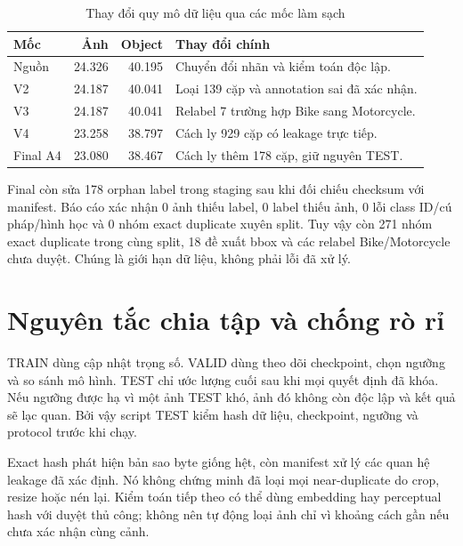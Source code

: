 \begin{table}[H]\centering
\caption{Thay đổi quy mô dữ liệu qua các mốc làm sạch}\label{tab:cleaning}
\begin{tabular}{lrrp{6.1cm}}\toprule
Mốc & Ảnh & Object & Thay đổi chính\\\midrule
Nguồn & 24.326 & 40.195 & Chuyển đổi nhãn và kiểm toán độc lập.\\
V2 & 24.187 & 40.041 & Loại 139 cặp và annotation sai đã xác nhận.\\
V3 & 24.187 & 40.041 & Relabel 7 trường hợp Bike sang Motorcycle.\\
V4 & 23.258 & 38.797 & Cách ly 929 cặp có leakage trực tiếp.\\
Final A4 & 23.080 & 38.467 & Cách ly thêm 178 cặp, giữ nguyên TEST.\\\bottomrule
\end{tabular}
\end{table}

Final còn sửa 178 orphan label trong staging sau khi đối chiếu checksum với manifest. Báo cáo xác nhận 0 ảnh thiếu label, 0 label thiếu ảnh, 0 lỗi class ID/cú pháp/hình học và 0 nhóm exact duplicate xuyên split. Tuy vậy còn 271 nhóm exact duplicate trong cùng split, 18 đề xuất bbox và các relabel Bike/Motorcycle chưa duyệt. Chúng là giới hạn dữ liệu, không phải lỗi đã xử lý.

\section{Nguyên tắc chia tập và chống rò rỉ}
TRAIN dùng cập nhật trọng số. VALID dùng theo dõi checkpoint, chọn ngưỡng và so sánh mô hình. TEST chỉ ước lượng cuối sau khi mọi quyết định đã khóa. Nếu ngưỡng được hạ vì một ảnh TEST khó, ảnh đó không còn độc lập và kết quả sẽ lạc quan. Bởi vậy script TEST kiểm hash dữ liệu, checkpoint, ngưỡng và protocol trước khi chạy.

Exact hash phát hiện bản sao byte giống hệt, còn manifest xử lý các quan hệ leakage đã xác định. Nó không chứng minh đã loại mọi near-duplicate do crop, resize hoặc nén lại. Kiểm toán tiếp theo có thể dùng embedding hay perceptual hash với duyệt thủ công; không nên tự động loại ảnh chỉ vì khoảng cách gần nếu chưa xác nhận cùng cảnh.
